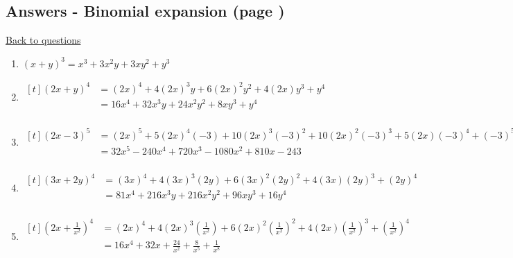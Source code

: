 \documentclass[../main.tex]{subfiles}
\begin{document}
\subsection*{Answers - Binomial expansion (page \pageref{Binomial Expansion})}
\label{Binomial expansion answers}
\hyperlink{binomialexpansionlink}{Back to questions}
\begin{enumerate}
    \item \( (x+y)^3 = x^3 + 3x^2 y + 3xy^2 +y^3 \)
    \item 
    $
    \!
    \begin{aligned}[t]
     (2x+y)^4 
        &= (2x)^4 + 4(2x)^3y + 6(2x)^2y^2 + 4(2x)y^3 + y^4 \\
        &= 16x^4 + 32x^3y + 24x^2y^2 + 8xy^3 + y^4 \\
    \end{aligned}
    $ 
    \item 
    $
    \!
    \begin{aligned}[t]
     (2x-3)^5 
        &= (2x)^5 + 5(2x)^4(-3) + 10(2x)^3(-3)^2 + 10(2x)^2(-3)^3 + 5(2x)(-3)^4 + (-3)^5 \\
        &= 32x^5 -240x^4 +720x^3 - 1080x^2 + 810x - 243 \\
    \end{aligned}
    $

    \item 
    $
    \!
    \begin{aligned}[t]
     (3x+2y)^4 
        &= (3x)^4 + 4(3x)^3(2y) + 6(3x)^2(2y)^2 + 4(3x)(2y)^3 + (2y)^4 \\
        &= 81x^4 +216x^3y +216x^2y^2 + 96xy^3 + 16y^4 \\
    \end{aligned}
    $

    \item 
    $
    \!
    \begin{aligned}[t]
     (2x + \frac{1}{x^2} )^4 
        &= (2x)^4 + 4(2x)^3(\frac{1}{x^2}) + 6(2x)^2(\frac{1}{x^2})^2 + 4(2x)(\frac{1}{x^2})^3 + (\frac{1}{x^2})^4 \\
        &= 16x^4 + 32x + \frac{24}{x^2} + \frac{8}{x^5} + \frac{1}{x^8}\\
    \end{aligned}
    $
    

\end{enumerate}
\end{document}
